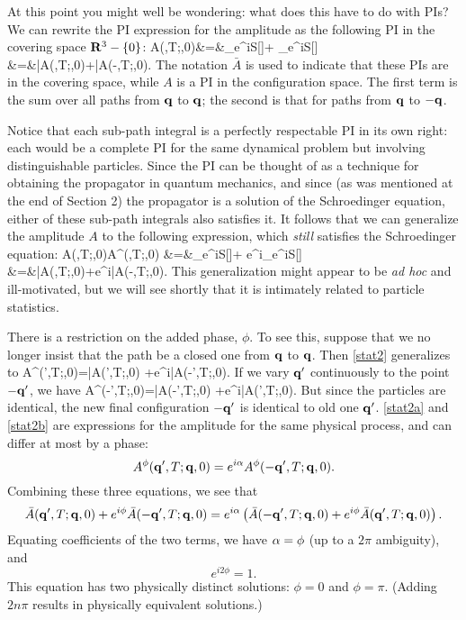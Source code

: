 \documentclass[12pt]{article}
\begin{document}
At this point you might well be wondering:
what does this have to do with PIs? We can rewrite the PI expression
for the amplitude as the following PI in the covering space
${\mathbf R}^3-\{0\}$:
\bea 
A(\bfq,T;\bfq,0)&=&\sum_{}e^{iS[\bfq]}+
\sum_{}e^{iS[\bfq]}\nonumber\\
&=&\bar A(\bfq,T;\bfq,0)+\bar A(-\bfq,T;\bfq,0).
\label{stat1}
\eea
The notation $\bar A$ is used to indicate that these PIs are
in the covering space, while $A$ is a PI in the
configuration space. The first term is the sum over all paths from
${\mathbf q}$ to ${\mathbf q}$; the second is that for paths from ${\mathbf q}$ to $-{\mathbf q}$.

Notice that each sub-path integral is a perfectly respectable PI in
its own right: each would be a complete PI for the same
dynamical problem but involving
distinguishable particles. Since the PI can
be thought of as a technique for obtaining the propagator in quantum
mechanics, and since (as was mentioned at the end of Section 2) the
propagator is a solution of the Schroedinger equation, either of these 
sub-path integrals also satisfies it. It follows that we can
generalize the amplitude $A$ to the following expression, which {\em
  still} satisfies the Schroedinger equation:
\bea
A(\bfq,T;\bfq,0)\to A^\phi(\bfq,T;\bfq,0)
&=&\sum_{}e^{iS[\bfq]}+
e^{i\phi}\sum_{}e^{iS[\bfq]}\nonumber\\
&=&\bar A(\bfq,T;\bfq,0)+e^{i\phi}\bar A(-\bfq,T;\bfq,0).
\label{stat2}
\eea
This generalization might appear to be {\it ad hoc} and ill-motivated,
but we will see shortly that it is intimately related to particle
statistics.

There is a restriction on the added
phase, $\phi$. To see this, suppose that
we no longer insist that the path be a closed one from ${\mathbf q}$ to
${\mathbf q}$. Then \eqref{stat2} generalizes to
\beq A^\phi(\bfq',T;\bfq,0)=\bar A(\bfq',T;\bfq,0)
+e^{i\phi}\bar A(-\bfq',T;\bfq,0).
\label{stat2a}
\eeq
If we vary ${\mathbf q}'$ continuously to the point $-{\mathbf q}'$, we have
\beq
A^\phi(-\bfq',T;\bfq,0)=\bar A(-\bfq',T;\bfq,0)
+e^{i\phi}\bar A(\bfq',T;\bfq,0).
\label{stat2b}
\eeq
But since the particles are identical,
the new final configuration $-{\mathbf q}'$ is identical to old one ${\mathbf q}'$.
\eqref{stat2a} and \eqref{stat2b} are expressions for the amplitude for
the same physical process, and can differ at most by a phase:
\[ A^\phi({\mathbf q}',T;{\mathbf q},0)=e^{i\alpha}A^\phi(-{\mathbf q}',T;{\mathbf q},0).
\]
Combining these three equations, we see that
\[
\bar A({\mathbf q}',T;{\mathbf q},0)+e^{i\phi}\bar A(-{\mathbf q}',T;{\mathbf q},0)
=e^{i\alpha}\left(
\bar A(-{\mathbf q}',T;{\mathbf q},0)+e^{i\phi}\bar A({\mathbf q}',T;{\mathbf q},0)\right).
\]
Equating coefficients of the two terms, we have $\alpha=\phi$ (up to a
$2\pi$ ambiguity), and
\[
e^{i2\phi}=1.
\]
This equation has two physically distinct solutions: $\phi=0$ and
$\phi=\pi$. (Adding $2n\pi$ results in physically equivalent
solutions.)
\end{document}
